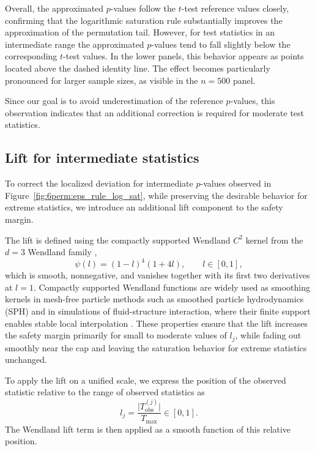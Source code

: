 Overall, the approximated $p$-values follow the $t$-test reference values closely, confirming that the logarithmic saturation rule substantially improves the approximation of the permutation tail. However, for test statistics in an intermediate range the approximated $p$-values tend to fall slightly below the corresponding $t$-test values. 
In the lower panels, this behavior appears as points located above the dashed identity line. The effect becomes particularly pronounced for larger sample sizes, as visible in the $n=500$ panel.

Since our goal is to avoid underestimation of the reference $p$-values, this observation indicates that an additional correction is required for moderate test statistics.


\subsection{Lift for intermediate statistics}
\label{sec:6perm:epsilon:lift}

To correct the localized deviation for intermediate $p$-values observed in Figure~\ref{fig:6perm:eps_rule_log_sat}, while preserving the desirable behavior for extreme statistics, we introduce an additional lift component to the safety margin.

The lift is defined using the compactly supported Wendland $C^2$ kernel from the $d=3$ Wendland family \citep{wendland1995piecewise},
\begin{equation}
\psi(l) = (1-l)^4(1+4l), \qquad l\in[0,1],
\label{eq:6perm:wendland}
\end{equation}
which is smooth, nonnegative, and vanishes together with its first two derivatives at $l=1$. 
Compactly supported Wendland functions are widely used as smoothing kernels in mesh-free particle methods such as smoothed particle hydrodynamics (SPH) and in simulations of fluid-structure interaction, where their finite support enables stable local interpolation \citep{beckert2001multivariate,liu2010smoothed}.
These properties ensure that the lift increases the safety margin primarily for small to moderate values of $l_j$, while fading out smoothly near the cap and leaving the saturation behavior for extreme statistics unchanged.

To apply the lift on a unified scale, we express the position of the observed statistic relative to the range of observed statistics as
\begin{equation}
\label{eq:6perm:rel_position}
l_j = \frac{\big|T_{\mathrm{obs}}^{(j)}\big|}{T_{\max}} \in [0,1].
\end{equation}
The Wendland lift term is then applied as a smooth function of this relative position.

